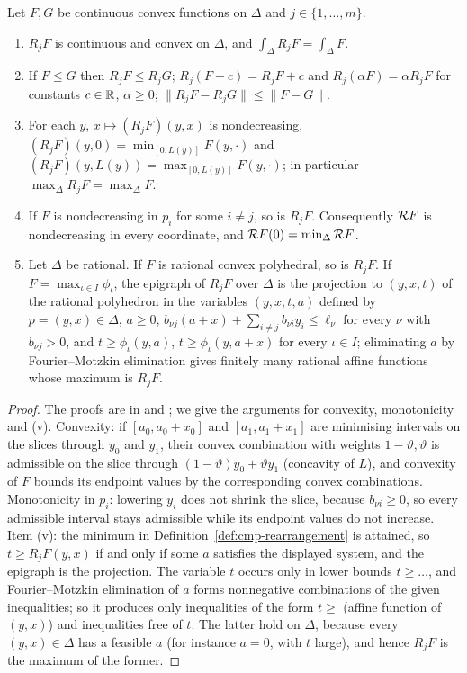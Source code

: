 \begin{lemma}[Properties of $R_j$]\label{lem:cmp-rearrangement}
Let $F,G$ be continuous convex functions on $\Delta$ and $j\in\{1,\dots,m\}$.
\begin{enumerate}[label=(\roman*)]
\item $R_jF$ is continuous and convex on $\Delta$, and $\int_\Delta R_jF=\int_\Delta F$.
\item If $F\le G$ then $R_jF\le R_jG$; $R_j(F+c)=R_jF+c$ and $R_j(\alpha F)=\alpha R_jF$ for constants $c\in\mathbb{R}$,
 $\alpha\ge0$; $\|R_jF-R_jG\|\le\|F-G\|$.
\item For each $y$, $x\mapsto(R_jF)(y,x)$ is nondecreasing, $(R_jF)(y,0)=\min_{[0,L(y)]}F(y,\cdot)$ and
 $(R_jF)(y,L(y))=\max_{[0,L(y)]}F(y,\cdot)$; in particular $\max_\Delta R_jF=\max_\Delta F$.
\item If $F$ is nondecreasing in $p_i$ for some $i\ne j$, so is $R_jF$. Consequently $\mathcal{R} F$ is
 nondecreasing in every coordinate, and $\mathcal{R} F(0)=\min_\Delta\mathcal{R} F$.
\item Let $\Delta$ be rational. If $F$ is rational convex polyhedral, so is $R_jF$. If $F=\max_{\iota\in I}\phi_\iota$,
 the epigraph of $R_jF$ over $\Delta$ is the projection to $(y,x,t)$ of the rational polyhedron in the variables
 $(y,x,t,a)$ defined by $p=(y,x)\in\Delta$, $a\ge0$, $b_{\nu j}(a+x)+\sum_{i\ne j}b_{\nu i}y_i\le\ell_\nu$ for every
 $\nu$ with $b_{\nu j}>0$, and $t\ge\phi_\iota(y,a)$, $t\ge\phi_\iota(y,a+x)$ for every $\iota\in I$; eliminating $a$
 by Fourier--Motzkin elimination gives finitely many rational affine functions whose maximum is $R_jF$.
\end{enumerate}
\end{lemma}

\begin{proof}
The proofs are in  and ; we give the arguments
for convexity, monotonicity and (v). Convexity: if $[a_0,a_0+x_0]$ and $[a_1,a_1+x_1]$ are minimising intervals on
the slices through $y_0$ and $y_1$, their convex combination with weights $1-\vartheta,\vartheta$ is admissible on the
slice through $(1-\vartheta)y_0+\vartheta y_1$ (concavity of $L$), and convexity of $F$ bounds its endpoint values by
the corresponding convex combinations. Monotonicity in $p_i$: lowering $y_i$ does not shrink the slice, because
$b_{\nu i}\ge0$, so every admissible interval stays admissible while its endpoint values do not increase. Item (v):
the minimum in Definition~\ref{def:cmp-rearrangement} is attained, so $t\ge R_jF(y,x)$ if and only if some $a$
satisfies the displayed system, and the epigraph is the projection. The variable $t$ occurs only in lower bounds
$t\ge\dots$, and Fourier--Motzkin elimination of $a$ forms nonnegative combinations of the given inequalities; so it
produces only inequalities of the form $t\ge$ (affine function of $(y,x)$) and inequalities free of $t$. The latter
hold on $\Delta$, because every $(y,x)\in\Delta$ has a feasible $a$ (for instance $a=0$, with $t$ large), and hence
$R_jF$ is the maximum of the former.
\end{proof}

